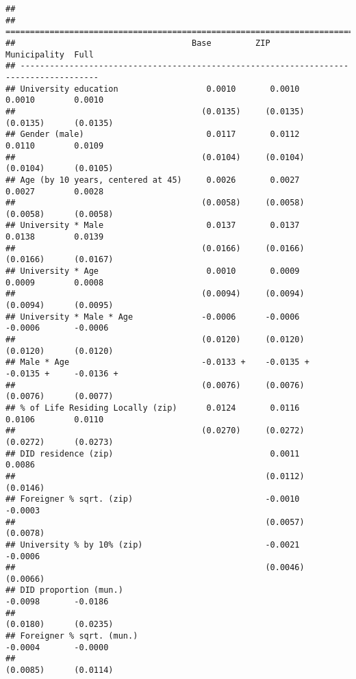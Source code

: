 \documentclass[
]{article}
\begin{document}
\begin{verbatim}
## 
## ======================================================================================
##                                    Base         ZIP          Municipality  Full       
## --------------------------------------------------------------------------------------
## University education                  0.0010       0.0010       0.0010        0.0010  
##                                      (0.0135)     (0.0135)     (0.0135)      (0.0135) 
## Gender (male)                         0.0117       0.0112       0.0110        0.0109  
##                                      (0.0104)     (0.0104)     (0.0104)      (0.0105) 
## Age (by 10 years, centered at 45)     0.0026       0.0027       0.0027        0.0028  
##                                      (0.0058)     (0.0058)     (0.0058)      (0.0058) 
## University * Male                     0.0137       0.0137       0.0138        0.0139  
##                                      (0.0166)     (0.0166)     (0.0166)      (0.0167) 
## University * Age                      0.0010       0.0009       0.0009        0.0008  
##                                      (0.0094)     (0.0094)     (0.0094)      (0.0095) 
## University * Male * Age              -0.0006      -0.0006      -0.0006       -0.0006  
##                                      (0.0120)     (0.0120)     (0.0120)      (0.0120) 
## Male * Age                           -0.0133 +    -0.0135 +    -0.0135 +     -0.0136 +
##                                      (0.0076)     (0.0076)     (0.0076)      (0.0077) 
## % of Life Residing Locally (zip)      0.0124       0.0116       0.0106        0.0110  
##                                      (0.0270)     (0.0272)     (0.0272)      (0.0273) 
## DID residence (zip)                                0.0011                     0.0086  
##                                                   (0.0112)                   (0.0146) 
## Foreigner % sqrt. (zip)                           -0.0010                    -0.0003  
##                                                   (0.0057)                   (0.0078) 
## University % by 10% (zip)                         -0.0021                    -0.0006  
##                                                   (0.0046)                   (0.0066) 
## DID proportion (mun.)                                          -0.0098       -0.0186  
##                                                                (0.0180)      (0.0235) 
## Foreigner % sqrt. (mun.)                                       -0.0004       -0.0000  
##                                                                (0.0085)      (0.0114) 

\end{verbatim}
\end{document}
